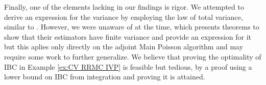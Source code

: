 \documentclass[a4paper,12pt]{article}
\begin{document}
Finally, one of the elements lacking in our findings is rigor. We attempted to derive an expression for the variance by employing the law of total variance, similar to \cite{rath_ears_2022}. However, we were unaware of \cite{ermakov_monte_2021} at the time, which presents theorems to show that their estimators have finite variance and provide an expression for it but this aplies only directly on the adjoint Main Poisson algorithm and may require some work to further generalize. We believe that proving the optimality of IBC in Example \ref{ex:CV RRMC IVP} is feasible but tedious, by a proof using a lower bound on IBC from integration and proving it is attained.


\newpage
\begin{abstract}
  
\end{abstract}

\printbibliography
\newpage
\end{document}
